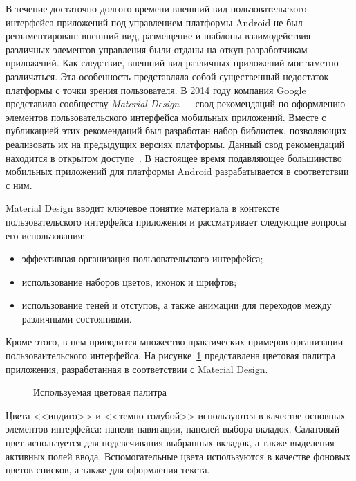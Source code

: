 В течение достаточно долгого времени внешний вид пользовательского интерфейса
приложений под управлением платформы Android не был регламентирован:
внешний вид, размещение и шаблоны взаимодействия различных элементов управления
были отданы на откуп разработчикам приложений.
Как следствие, внешний вид различных приложений мог заметно различаться.
Эта особенность представляла собой существенный недостаток платформы
с точки зрения пользователя.
В 2014 году компания Google представила сообществу \textit{Material Design} ---
свод рекомендаций по оформлению элементов пользовательского интерфейса
мобильных приложений. Вместе с публикацией этих рекомендаций был
разработан набор библиотек, позволяющих реализовать их на предыдущих версиях платформы.
Данный свод рекомендаций находится в открытом доступе~\cite{material_design}.
В настоящее время подавляющее большинство мобильных приложений для
платформы Android разрабатывается в соответствии с ним.

Material Design вводит ключевое понятие материала в контексте
пользовательского интерфейса приложения и рассматривает следующие
вопросы его использования:
\begin{itemize}
\item эффективная организация пользовательского интерфейса;
\item использование наборов цветов, иконок и шрифтов;
\item использование теней и отступов,
  а также анимации для переходов между различными состояниями.
\end{itemize}

Кроме этого, в нем приводится множество практических примеров
организации пользоваительского интерфейса.
На рисунке~\ref{fig:design_colors} представлена цветовая палитра
приложения, разработанная в соответствии с Material Design.

\begin{figure}[h!]
  \centering
  \caption{Используемая цветовая палитра}
  \label{fig:design_colors}
\end{figure}

Цвета <<индиго>> и <<темно-голубой>>
используются в качестве основных элементов интерфейса:
панели навигации, панелей выбора вкладок.
Салатовый цвет используется для подсвечивания выбранных вкладок,
а также выделения активных полей ввода.
Вспомогательные цвета используются в качестве фоновых цветов списков,
а также для оформления текста.


